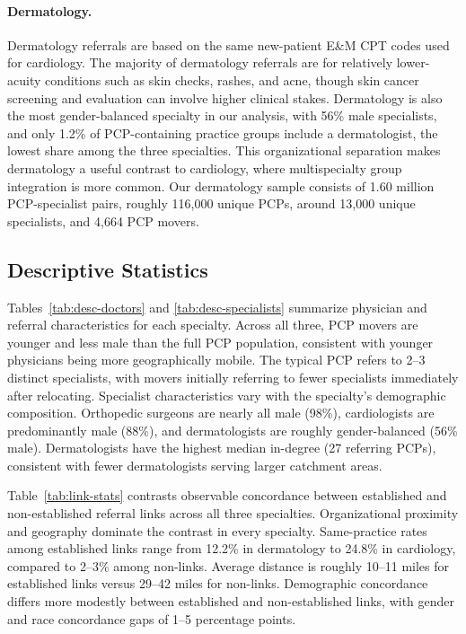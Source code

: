 \documentclass[12pt]{article}
\begin{document}
\paragraph{Dermatology.} Dermatology referrals are based on the same new-patient E\&M CPT codes used for cardiology. The majority of dermatology referrals are for relatively lower-acuity conditions such as skin checks, rashes, and acne, though skin cancer screening and evaluation can involve higher clinical stakes. Dermatology is also the most gender-balanced specialty in our analysis, with 56\% male specialists, and only 1.2\% of PCP-containing practice groups include a dermatologist, the lowest share among the three specialties. This organizational separation makes dermatology a useful contrast to cardiology, where multispecialty group integration is more common. Our dermatology sample consists of 1.60 million PCP-specialist pairs, roughly 116,000 unique PCPs, around 13,000 unique specialists, and 4,664 PCP movers.

\subsection{Descriptive Statistics}
\label{sec:desc}

Tables~\ref{tab:desc-doctors} and \ref{tab:desc-specialists} summarize physician and referral characteristics for each specialty. Across all three, PCP movers are younger and less male than the full PCP population, consistent with younger physicians being more geographically mobile. The typical PCP refers to 2--3 distinct specialists, with movers initially referring to fewer specialists immediately after relocating. Specialist characteristics vary with the specialty's demographic composition. Orthopedic surgeons are nearly all male (98\%), cardiologists are predominantly male (88\%), and dermatologists are roughly gender-balanced (56\% male). Dermatologists have the highest median in-degree (27 referring PCPs), consistent with fewer dermatologists serving larger catchment areas.

Table~\ref{tab:link-stats} contrasts observable concordance between established and non-established referral links across all three specialties. Organizational proximity and geography dominate the contrast in every specialty. Same-practice rates among established links range from 12.2\% in dermatology to 24.8\% in cardiology, compared to 2--3\% among non-links. Average distance is roughly 10--11 miles for established links versus 29--42 miles for non-links. Demographic concordance differs more modestly between established and non-established links, with gender and race concordance gaps of 1--5 percentage points.
\end{document}
